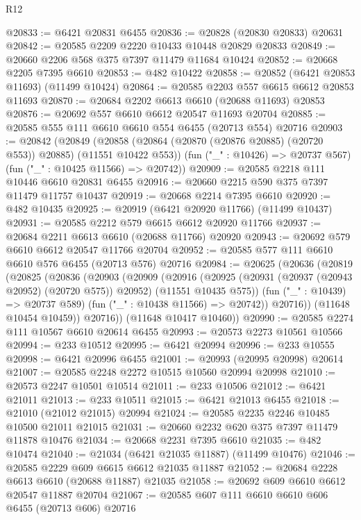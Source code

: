 \begin{lexlean}{R12}
\begin{coremodule}
{{{{{{{{{{{{{{{{{{{{{{{{{{{{{{{{{{{{{{{{{{{{{{{{{{{{{{{{{{{{{{{{{{{{{{{{{{{{{{{{{{@20833 := @6421 @20831 @6455
@20836 := @20828 (@20830 @20833) @20631
@20842 := @20585 @2209 @2220 @10433 @10448 @20829 @20833
@20849 := @20660 @2206 @568 @375 @7397 @11479 @11684 @10424
@20852 := @20668 @2205 @7395 @6610
@20853 := @482 @10422
@20858 := @20852 (@6421 @20853 @11693) (@11499 @10424)
@20864 := @20585 @2203 @557 @6615 @6612 @20853 @11693
@20870 := @20684 @2202 @6613 @6610 (@20688 @11693) @20853
@20876 := @20692 @557 @6610 @6612 @20547 @11693 @20704
@20885 := @20585 @555 @111 @6610 @6610 @554 @6455 (@20713 @554) @20716
@20903 := @20842
    (@20849
      (@20858 (@20864 (@20870 (@20876 @20885) (@20720 @553)) @20885) (@11551 @10422 @553))
      (fun ("_" : @10426) => @20737 @567)
      (fun ("_" : @10425 @11566) => @20742))
@20909 := @20585 @2218 @111 @10446 @6610 @20831 @6455
@20916 := @20660 @2215 @590 @375 @7397 @11479 @11757 @10437
@20919 := @20668 @2214 @7395 @6610
@20920 := @482 @10435
@20925 := @20919 (@6421 @20920 @11766) (@11499 @10437)
@20931 := @20585 @2212 @579 @6615 @6612 @20920 @11766
@20937 := @20684 @2211 @6613 @6610 (@20688 @11766) @20920
@20943 := @20692 @579 @6610 @6612 @20547 @11766 @20704
@20952 := @20585 @577 @111 @6610 @6610 @576 @6455 (@20713 @576) @20716
@20984 := @20625
    (@20636
      (@20819
        (@20825
          (@20836
            (@20903
              (@20909
                (@20916
                  (@20925
                    (@20931 (@20937 (@20943 @20952) (@20720 @575)) @20952)
                    (@11551 @10435 @575))
                  (fun ("_" : @10439) => @20737 @589)
                  (fun ("_" : @10438 @11566) => @20742))
                @20716))
            (@11648 @10454 @10459))
          @20716))
      (@11648 @10417 @10460))
@20990 := @20585 @2274 @111 @10567 @6610 @20614 @6455
@20993 := @20573 @2273 @10561 @10566
@20994 := @233 @10512
@20995 := @6421 @20994
@20996 := @233 @10555
@20998 := @6421 @20996 @6455
@21001 := @20993 (@20995 @20998) @20614
@21007 := @20585 @2248 @2272 @10515 @10560 @20994 @20998
@21010 := @20573 @2247 @10501 @10514
@21011 := @233 @10506
@21012 := @6421 @21011
@21013 := @233 @10511
@21015 := @6421 @21013 @6455
@21018 := @21010 (@21012 @21015) @20994
@21024 := @20585 @2235 @2246 @10485 @10500 @21011 @21015
@21031 := @20660 @2232 @620 @375 @7397 @11479 @11878 @10476
@21034 := @20668 @2231 @7395 @6610
@21035 := @482 @10474
@21040 := @21034 (@6421 @21035 @11887) (@11499 @10476)
@21046 := @20585 @2229 @609 @6615 @6612 @21035 @11887
@21052 := @20684 @2228 @6613 @6610 (@20688 @11887) @21035
@21058 := @20692 @609 @6610 @6612 @20547 @11887 @20704
@21067 := @20585 @607 @111 @6610 @6610 @606 @6455 (@20713 @606) @20716
}}}}}}}}}}}}}}}}}}}}}}}}}}}}}}}}}}}}}}}}}}}}}}}}}}}}}}}}}}}}}}}}}}}}}}}}}}}}}}}}}}
\end{coremodule}
\end{lexlean}

